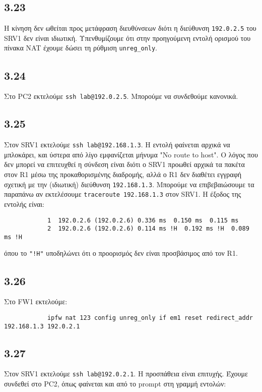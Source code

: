 \documentclass[a4paper, 12pt]{article}
\begin{document}
	\subsection*{3.23}
		Η κίνηση δεν ωθείται προς μετάφραση διευθύνσεων διότι η διεύθυνση \verb|192.0.2.5| του SRV1 δεν είναι ιδιωτική. Υπενθυμίζουμε ότι στην προηγούμενη εντολή ορισμού του πίνακα NAT έχουμε δώσει τη ρύθμιση \verb|unreg_only|.
		
	\subsection*{3.24}
		Στο PC2 εκτελούμε \verb|ssh lab@192.0.2.5|. Μπορούμε να συνδεθούμε κανονικά.

	\subsection*{3.25}
		Στον SRV1 εκτελούμε \verb|ssh lab@192.168.1.3|. Η εντολή φαίνεται αρχικά να μπλοκάρει, και ύστερα από λίγο εμφανίζεται μήνυμα "No route to host". Ο λόγος που δεν μπορεί να επιτευχθεί η σύνδεση είναι διότι ο SRV1 προωθεί αρχικά τα πακέτα στον R1 μέσω της προκαθορισμένης διαδρομής, αλλά ο R1 δεν διαθέτει εγγραφή σχετική με την (ιδιωτική) διεύθυνση \verb|192.168.1.3|. Μπορούμε να επιβεβαιώσουμε τα παραπάνω αν εκτελέσουμε \verb|traceroute 192.168.1.3| στον SRV1. Η έξοδος της εντολής είναι:
		
		\begin{verbatim}
			1  192.0.2.6 (192.0.2.6) 0.336 ms  0.150 ms  0.115 ms
			2  192.0.2.6 (192.0.2.6) 0.114 ms !H  0.192 ms !H  0.089 ms !H
		\end{verbatim}
		
		όπου το \verb|"!H"| υποδηλώνει ότι ο προορισμός δεν είναι προσβάσιμος από τον R1.

	\subsection*{3.26}
		Στο FW1 εκτελούμε:
		
		\begin{verbatim}
			ipfw nat 123 config unreg_only if em1 reset redirect_addr 192.168.1.3 192.0.2.1
		\end{verbatim}

	\subsection*{3.27}
		Στον SRV1 εκτελούμε \verb|ssh lab@192.0.2.1|. Η προσπάθεια είναι επιτυχής. Έχουμε συνδεθεί στο PC2, όπως φαίνεται και από το prompt στη γραμμή εντολών:
		
\end{document}
